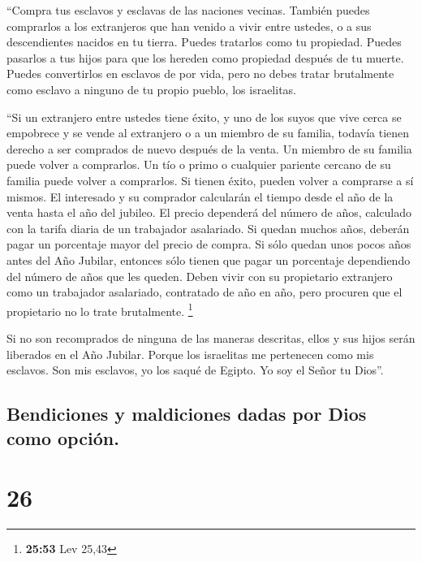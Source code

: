  ``Compra tus esclavos y esclavas de las naciones
vecinas.  También puedes comprarlos a los extranjeros que
han venido a vivir entre ustedes, o a sus descendientes nacidos en tu
tierra. Puedes tratarlos como tu propiedad.  Puedes
pasarlos a tus hijos para que los hereden como propiedad después de tu
muerte. Puedes convertirlos en esclavos de por vida, pero no debes
tratar brutalmente como esclavo a ninguno de tu propio pueblo, los
israelitas.

 ``Si un extranjero entre ustedes tiene éxito, y uno de
los suyos que vive cerca se empobrece y se vende al extranjero o a un
miembro de su familia,  todavía tienen derecho a ser
comprados de nuevo después de la venta. Un miembro de su familia puede
volver a comprarlos.  Un tío o primo o cualquier pariente
cercano de su familia puede volver a comprarlos. Si tienen éxito, pueden
volver a comprarse a sí mismos.  El interesado y su
comprador calcularán el tiempo desde el año de la venta hasta el año del
jubileo. El precio dependerá del número de años, calculado con la tarifa
diaria de un trabajador asalariado.  Si quedan muchos
años, deberán pagar un porcentaje mayor del precio de compra.
 Si sólo quedan unos pocos años antes del Año Jubilar,
entonces sólo tienen que pagar un porcentaje dependiendo del número de
años que les queden.  Deben vivir con su propietario
extranjero como un trabajador asalariado, contratado de año en año, pero
procuren que el propietario no lo trate brutalmente. \footnote{\textbf{25:53}
  Lev 25,43}

 Si no son recomprados de ninguna de las maneras
descritas, ellos y sus hijos serán liberados en el Año Jubilar.
 Porque los israelitas me pertenecen como mis esclavos.
Son mis esclavos, yo los saqué de Egipto. Yo soy el Señor tu Dios''.

\hypertarget{bendiciones-y-maldiciones-dadas-por-dios-como-opciuxf3n.}{%
\subsection{Bendiciones y maldiciones dadas por Dios como
opción.}\label{bendiciones-y-maldiciones-dadas-por-dios-como-opciuxf3n.}}

\hypertarget{section-25}{%
\section{26}\label{section-25}}

